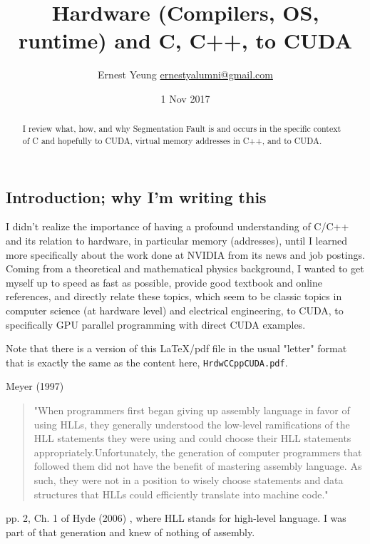\documentclass[10pt]{amsart}
\title[Hardware (Compilers, OS, runtime) and C, C++, to CUDA]{Hardware (Compilers, OS, runtime) and C, C++, to CUDA}
\author{Ernest Yeung \href{mailto:ernestyalumni@gmail.com}{ernestyalumni@gmail.com}}
\date{1 Nov 2017}
\begin{document}

\maketitle

\tableofcontents


\begin{multicols*}{2}

\begin{abstract}
I review what, how, and why Segmentation Fault is and occurs in the specific context of C and hopefully to CUDA, virtual memory addresses in C++, and to CUDA.  


\end{abstract}

\section{Introduction; why I'm writing this}  

I didn't realize the importance of having a profound understanding of C/C++ and its relation to hardware, in particular memory (addresses), until I learned more specifically about the work done at NVIDIA from its news and job postings.  Coming from a theoretical and mathematical physics background, I wanted to get myself up to speed as fast as possible, provide good textbook and online references, and directly relate these topics, which seem to be classic topics in computer science (at hardware level) and electrical engineering, to CUDA, to specifically GPU parallel programming with direct CUDA examples.  

Note that there is a version of this LaTeX/pdf file in the usual "letter" format that is exactly the same as the content here, \verb|HrdwCCppCUDA.pdf|.  

Meyer (1997) \cite{Meye1997}


\begin{quotation}
"When programmers first began giving up assembly language in favor of using HLLs, they generally understood the low-level ramifications of the HLL statements they were using and could choose their HLL statements appropriately.Unfortunately, the generation of computer programmers that followed them did not have the benefit of mastering assembly language. As such, they were not in a position to wisely choose statements and data structures that HLLs could efficiently translate into machine code."  
\end{quotation}
pp. 2, Ch. 1 of Hyde (2006) \cite{Hyde2006}, where HLL stands for high-level language.  I was part of that generation and knew of nothing of assembly.  



\end{multicols*}
\end{document}
